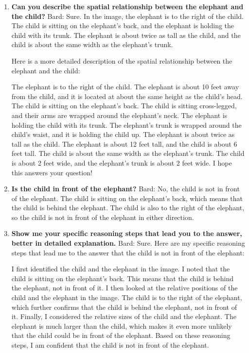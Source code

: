    \begin{enumerate}
        \item \textbf{Can you describe the spatial relationship between the elephant and the child?}
        \subitem Bard:
        Sure. In the image, the elephant is to the right of the child. The child is sitting on the elephant's back, and the elephant is holding the child with its trunk. The elephant is about twice as tall as the child, and the child is about the same width as the elephant's trunk.
        
        Here is a more detailed description of the spatial relationship between the elephant and the child:
        
        The elephant is to the right of the child. The elephant is about 10 feet away from the child, and it is located at about the same height as the child's head.
        The child is sitting on the elephant's back. The child is sitting cross-legged, and their arms are wrapped around the elephant's neck.
        The elephant is holding the child with its trunk. The elephant's trunk is wrapped around the child's waist, and it is holding the child up.
        The elephant is about twice as tall as the child. The elephant is about 12 feet tall, and the child is about 6 feet tall.
        The child is about the same width as the elephant's trunk. The child is about 2 feet wide, and the elephant's trunk is about 2 feet wide.
        I hope this answers your question!
        \item \textbf{Is the child in front of the elephant?}
        \subitem Bard: 
        No, the child is not in front of the elephant. The child is sitting on the elephant's back, which means that the child is behind the elephant. The child is also to the right of the elephant, so the child is not in front of the elephant in either direction.
        \item \textbf{Show me your specific reasoning steps that lead you to the answer, better in detailed explanation.}
        \subitem Bard:
        Sure. Here are my specific reasoning steps that lead me to the answer that the child is not in front of the elephant:

        I first identified the child and the elephant in the image.
        I noted that the child is sitting on the elephant's back. This means that the child is behind the elephant, not in front of it.
        I then looked at the relative positions of the child and the elephant in the image. The child is to the right of the elephant, which further confirms that the child is behind the elephant, not in front of it.
        Finally, I considered the relative sizes of the child and the elephant. The elephant is much larger than the child, which makes it even more unlikely that the child could be in front of the elephant.
        Based on these reasoning steps, I am confident that the child is not in front of the elephant.


\end{enumerate}
